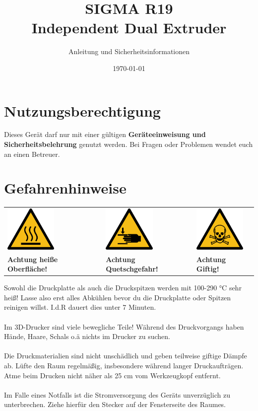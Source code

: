 \documentclass[a4paper]{article}
\begin{document}
\author{Anleitung und Sicherheitsinformationen} %
\title{SIGMA R19 \\ Independent Dual Extruder}
\date{\today{}} %
\maketitle{} %
\section{Nutzungsberechtigung}
Dieses Gerät darf nur mit einer gültigen \textbf{Geräteeinweisung und Sicherheitsbelehrung} genutzt werden. Bei Fragen oder Problemen wendet euch an einen Betreuer.
\section{Gefahrenhinweise}
\begin{center}
	\begin{tabular}{C{5cm}C{5cm}C{5cm}}
		\includegraphics[width=2.5cm]{hot-surface.png} & \includegraphics[width=2.5cm]{hand-injury.png} & \includegraphics[width=2.5cm]{toxic.png}\\
		\textbf{Achtung heiße Oberfläche!} & \textbf{Achtung Quetschgefahr!} & \textbf{Achtung Giftig!}
	\end{tabular}
\end{center}

		
 Sowohl die Druckplatte als auch die Druckspitzen werden mit 100-290 °C sehr heiß!
 Lasse also erst alles Abkühlen bevor du die Druckplatte oder Spitzen reinigen willst.
 I.d.R dauert dies unter 7 Minuten.\\\\
Im 3D-Drucker sind viele bewegliche Teile! Während des Druckvorgangs haben Hände, Haare, Schals o.ä nichts im Drucker zu suchen.\\\\
Die Druckmaterialien sind nicht unschädlich und geben teilweise giftige Dämpfe ab. Lüfte den Raum regelmäßig, insbesondere während langer Druckaufträgen. Atme beim Drucken nicht näher als 25 cm vom Werkzeugkopf entfernt.\\\\
Im Falle eines Notfalls ist die Stromversorgung des Geräts unverzüglich zu unterbrechen. Ziehe hierfür den Stecker auf der Fensterseite des Raumes.
\end{document}
